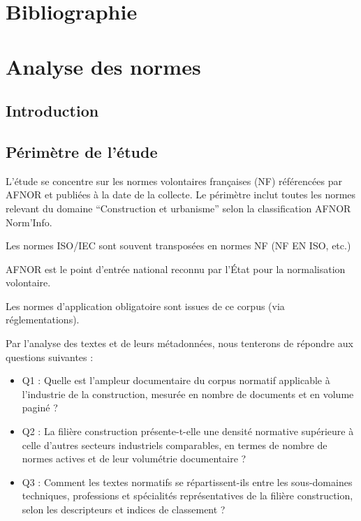 \documentclass[a4paper,12pt]{article}
\begin{document}
\clearpage
\section{Bibliographie}
\label{sec:org3a10577}
\printbibliography[heading=none]

\clearpage

\appendix
\section{Analyse des normes}
\label{sec:orgece216d}
\subsection{Introduction}
\label{sec:orgd4c5ec8}
\subsection{Périmètre de l'étude}
\label{sec:orgb5ef134}
L’étude se concentre sur les normes volontaires françaises (NF) référencées par AFNOR et publiées à la date de la collecte.
Le périmètre inclut toutes les normes relevant du domaine “Construction et urbanisme” selon la classification AFNOR Norm’Info.

Les normes ISO/IEC sont souvent transposées en normes NF (NF EN ISO, etc.)

AFNOR est le point d’entrée national reconnu par l’État pour la normalisation volontaire.

Les normes d’application obligatoire sont issues de ce corpus (via réglementations).

Par l'analyse des textes et de leurs métadonnées, nous tenterons de répondre aux questions suivantes :

\begin{itemize}
\item Q1 : Quelle est l’ampleur documentaire du corpus normatif applicable à l’industrie de la construction, mesurée en nombre de documents et en volume paginé ?
\item Q2 : La filière construction présente-t-elle une densité normative supérieure à celle d’autres secteurs industriels comparables, en termes de nombre de normes actives et de leur volumétrie documentaire ?
\item Q3 : Comment les textes normatifs se répartissent-ils entre les sous-domaines techniques, professions et spécialités représentatives de la filière construction, selon les descripteurs et indices de classement ?
\end{itemize}
\end{document}

